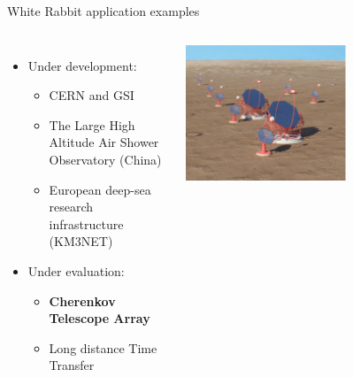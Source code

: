 \documentclass[compress, red]{beamer}
\begin{document}
\begin{frame}{White Rabbit application examples}
\begin{columns}[c]
    \begin{itemize}
      \item Under development:
      \begin{itemize}
	\item CERN and GSI
	\item The Large High Altitude Air Shower Observatory (China)
	\item European deep-sea research infrastructure (KM3NET) 
      \end{itemize}         	
      \item Under evaluation:
      \begin{itemize}
	\item \textbf{Cherenkov Telescope Array}
	\item Long distance Time Transfer
      \end{itemize}         	
    \end{itemize}    
    \begin{center}
      \includegraphics[width=0.6\textwidth]{applications/cta.pdf}
      \end{center}
\end{columns}
\end{frame}
\end{document}
